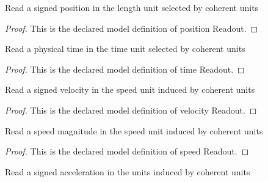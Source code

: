 \begin{definition}
  \label{def:physics:phyx-mini-0793:phyxminiproblems-problemphyxmini0793-positionreadout}
  Read a signed position in the length unit selected by coherent units
\end{definition}
\begin{proof}
  This is the declared model definition of position Readout.
\end{proof}
\begin{definition}
  \label{def:physics:phyx-mini-0793:phyxminiproblems-problemphyxmini0793-timereadout}
  Read a physical time in the time unit selected by coherent units
\end{definition}
\begin{proof}
  This is the declared model definition of time Readout.
\end{proof}
\begin{definition}
  \label{def:physics:phyx-mini-0793:phyxminiproblems-problemphyxmini0793-velocityreadout}
  Read a signed velocity in the speed unit induced by coherent units
\end{definition}
\begin{proof}
  This is the declared model definition of velocity Readout.
\end{proof}
\begin{definition}
  \label{def:physics:phyx-mini-0793:phyxminiproblems-problemphyxmini0793-speedreadout}
  Read a speed magnitude in the speed unit induced by coherent units
\end{definition}
\begin{proof}
  This is the declared model definition of speed Readout.
\end{proof}
\begin{definition}
  \label{def:physics:phyx-mini-0793:phyxminiproblems-problemphyxmini0793-accelerationreadout}
  Read a signed acceleration in the units induced by coherent units
\end{definition}
